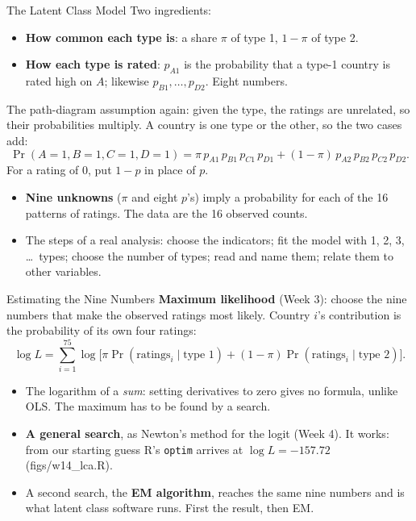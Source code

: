 \documentclass[aspectratio=169,11pt,xcolor=dvipsnames]{beamer}
\newcommand{\srcp}[1]{{\scriptsize\color{gray}(#1)}}
\begin{document}
\begin{frame}{The Latent Class Model}
Two ingredients:
\begin{itemize}\itemsep2pt
  \item \textbf{How common each type is}: a share $\pi$ of type 1, $1 - \pi$ of type 2.
  \item \textbf{How each type is rated}: $p_{A1}$ is the probability that a type-1 country is rated
        high on $A$; likewise $p_{B1}, \dots, p_{D2}$. Eight numbers.
\end{itemize}
The path-diagram assumption again: given the type, the ratings are unrelated, so their
probabilities multiply. A country is one type or the other, so the two cases add:
\[ \Pr(A = 1, B = 1, C = 1, D = 1) = \pi\, p_{A1}\, p_{B1}\, p_{C1}\, p_{D1}
     + (1 - \pi)\, p_{A2}\, p_{B2}\, p_{C2}\, p_{D2} . \]
\vskip-4pt
For a rating of 0, put $1 - p$ in place of $p$.
\begin{itemize}\itemsep3pt
  \item \textbf{Nine unknowns} ($\pi$ and eight $p$'s) imply a probability for each of the 16
        patterns of ratings. The data are the 16 observed counts.
  \item The steps of a real analysis: choose the indicators; fit the model with 1, 2, 3, \dots\
        types; choose the number of types; read and name them; relate them to other variables.
\end{itemize}
\end{frame}

\begin{frame}{Estimating the Nine Numbers}
\textbf{Maximum likelihood} (Week 3): choose the nine numbers that make the observed ratings most
likely. Country $i$'s contribution is the probability of its own four ratings:
\[ \log L = \sum_{i=1}^{75} \log \Big[ \pi \Pr(\text{ratings}_i \mid \text{type 1})
     + (1 - \pi) \Pr(\text{ratings}_i \mid \text{type 2}) \Big] . \]
\vskip-4pt
\begin{itemize}\itemsep4pt
  \item The logarithm of a \emph{sum}: setting derivatives to zero gives no formula, unlike OLS.
        The maximum has to be found by a search.
  \item \textbf{A general search}, as Newton's method for the logit (Week 4). It works: from our
        starting guess R's \texttt{optim} arrives at $\log L = -157.72$ \srcp{figs/w14\_lca.R}.
  \item A second search, the \textbf{EM algorithm}, reaches the same nine numbers and is what
        latent class software runs. First the result, then EM.
\end{itemize}
\end{frame}
\end{document}
